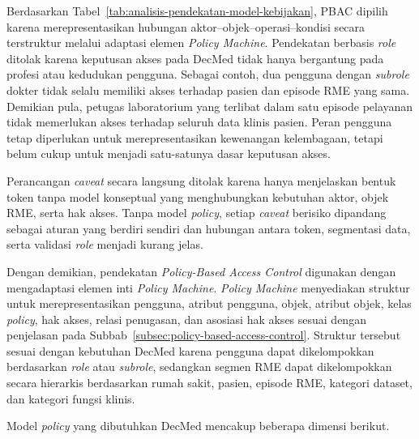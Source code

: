 Berdasarkan Tabel~\ref{tab:analisis-pendekatan-model-kebijakan}, PBAC dipilih karena merepresentasikan hubungan aktor--objek--operasi--kondisi secara terstruktur melalui adaptasi elemen \textit{Policy Machine}. Pendekatan berbasis \textit{role} ditolak karena keputusan akses pada DecMed tidak hanya bergantung pada profesi atau kedudukan pengguna. Sebagai contoh, dua pengguna dengan \textit{subrole} dokter tidak selalu memiliki akses terhadap pasien dan episode RME yang sama. Demikian pula, petugas laboratorium yang terlibat dalam satu episode pelayanan tidak memerlukan akses terhadap seluruh data klinis pasien. Peran pengguna tetap diperlukan untuk merepresentasikan kewenangan kelembagaan, tetapi belum cukup untuk menjadi satu-satunya dasar keputusan akses.

Perancangan \textit{caveat} secara langsung ditolak karena hanya menjelaskan bentuk token tanpa model konseptual yang menghubungkan kebutuhan aktor, objek RME, serta hak akses. Tanpa model \textit{policy}, setiap \textit{caveat} berisiko dipandang sebagai aturan yang berdiri sendiri dan hubungan antara token, segmentasi data, serta validasi \textit{role} menjadi kurang jelas.

Dengan demikian, pendekatan \textit{Policy-Based Access Control} digunakan dengan mengadaptasi elemen inti \textit{Policy Machine}. \textit{Policy Machine} menyediakan struktur untuk merepresentasikan pengguna, atribut pengguna, objek, atribut objek, kelas \textit{policy}, hak akses, relasi penugasan, dan asosiasi hak akses sesuai dengan penjelasan pada Subbab~\ref{subsec:policy-based-access-control}. Struktur tersebut sesuai dengan kebutuhan DecMed karena pengguna dapat dikelompokkan berdasarkan \textit{role} atau \textit{subrole}, sedangkan segmen RME dapat dikelompokkan secara hierarkis berdasarkan rumah sakit, pasien, episode RME, kategori dataset, dan kategori fungsi klinis.

Model \textit{policy} yang dibutuhkan DecMed mencakup beberapa dimensi berikut.

